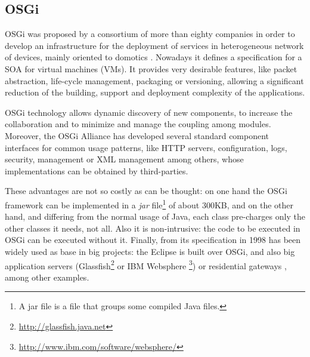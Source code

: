 \subsection{OSGi}
\label{subsec:soa:osgi}
OSGi was proposed by a consortium of more than
eighty companies in order to develop an infrastructure for the
deployment of services in heterogeneous network of devices, mainly
oriented to domotics \cite{GarciaSanchez2013Gateway}. Nowadays it defines a
specification for a SOA for virtual
machines (VMs). It provides very desirable features, like
packet abstraction, life-cycle management, packaging or versioning, %
allowing a significant reduction of the building, support and deployment
complexity of the applications. 

OSGi technology allows dynamic discovery of new components, to increase the collaboration and to minimize and manage the coupling
among modules. Moreover, the
OSGi Alliance has developed several standard component interfaces for
common usage patterns, like HTTP servers, configuration, logs, security,
management or XML management among others, whose implementations can
be obtained by third-parties. %

These advantages are not so
                               costly as can be thought: on one hand the OSGi
                                framework can be implemented in a
                                {\em jar} file\footnote{A jar file is
                                a file that groups some compiled Java
                                files.} of about 300KB, and on the other hand, and differing from
                                the normal usage of Java, each
                                class pre-charges only the other
                                classes it needs, not all. Also it is
                                non-intrusive: the code to be
                                executed in OSGi can be executed
                                without it. Finally, from its
                                specification in 1998 has been widely
                                used as base in big projects: the
                                Eclipse  is built over OSGi, and
                                also big application servers
                               (Glassfish\footnote{\url{http://glassfish.java.net}} 
                               or IBM Websphere \footnote{\url{http://www.ibm.com/software/websphere/}}) or
                               residential gateways
                               \cite{GarciaSanchez2013Gateway}, among other
                               examples. 



